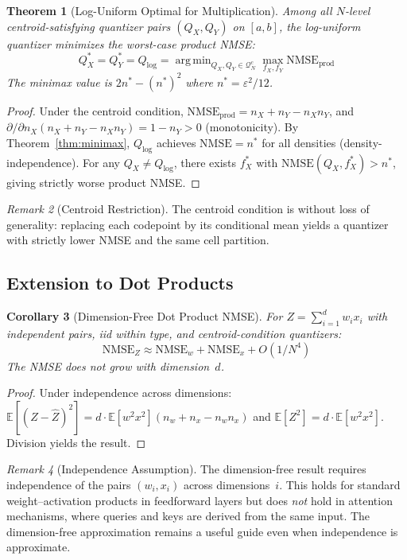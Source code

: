\documentclass[11pt,letterpaper]{article}
\newtheorem{theorem}{Theorem}[section]
\newtheorem{corollary}[theorem]{Corollary}
\theoremstyle{definition}
\theoremstyle{remark}
\newtheorem{remark}[theorem]{Remark}
\newcommand{\NMSE}{\mathrm{NMSE}}
\newcommand{\E}{\mathbb{E}}
\DeclareMathOperator*{\argmin}{arg\,min}
\begin{document}
\begin{theorem}[Log-Uniform Optimal for Multiplication]
\label{thm:product-optimal}
Among all $N$-level centroid-satisfying quantizer pairs $(Q_X, Q_Y)$ on $[a,b]$,
the log-uniform quantizer minimizes the worst-case product NMSE:
\[
  Q_X^* = Q_Y^* = Q_{\log} = \argmin_{Q_X, Q_Y \in \mathcal{Q}_N^c}
  \max_{f_X, f_Y} \NMSE_{\mathrm{prod}}
\]
The minimax value is $2n^* - (n^*)^2$ where $n^* = \varepsilon^2/12$.
\end{theorem}

\begin{proof}
Under the centroid condition,
$\NMSE_{\mathrm{prod}} = n_X + n_Y - n_X n_Y$, and
$\partial/\partial n_X(n_X + n_Y - n_X n_Y) = 1 - n_Y > 0$
(monotonicity).
By Theorem~\ref{thm:minimax}, $Q_{\log}$ achieves $\NMSE = n^*$ for all
densities (density-independence).
For any $Q_X \neq Q_{\log}$, there exists $f_X^*$ with
$\NMSE(Q_X, f_X^*) > n^*$, giving strictly worse product NMSE.
\end{proof}

\begin{remark}[Centroid Restriction]
The centroid condition is without loss of generality: replacing each codepoint
by its conditional mean yields a quantizer with strictly lower NMSE and the same
cell partition.
\end{remark}

\subsection{Extension to Dot Products}

\begin{corollary}[Dimension-Free Dot Product NMSE]
\label{cor:dotproduct}
For $Z = \sum_{i=1}^d w_i x_i$ with independent pairs, iid within type, and
centroid-condition quantizers:
\begin{equation}
  \NMSE_Z \approx \NMSE_w + \NMSE_x + O(1/N^4)
\end{equation}
The NMSE \emph{does not grow with dimension~$d$}.
\end{corollary}

\begin{proof}
Under independence across dimensions:
$\E[(Z - \hat{Z})^2] = d \cdot \E[w^2 x^2](n_w + n_x - n_w n_x)$
and $\E[Z^2] = d \cdot \E[w^2 x^2]$.
Division yields the result.
\end{proof}

\begin{remark}[Independence Assumption]
\label{rem:independence}
The dimension-free result requires independence of the pairs $(w_i, x_i)$ across
dimensions~$i$.
This holds for standard weight--activation products in feedforward layers but
does \emph{not} hold in attention mechanisms, where queries and keys are derived
from the same input.
The dimension-free approximation remains a useful guide even when independence
is approximate.
\end{remark}
\end{document}
